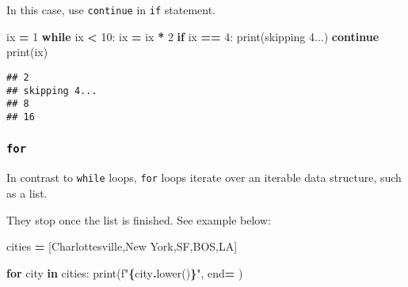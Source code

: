 \documentclass[
]{book}
\newenvironment{Shaded}{\begin{snugshade}}{\end{snugshade}}
\newcommand{\BuiltInTok}[1]{#1}
\newcommand{\ControlFlowTok}[1]{\textcolor[rgb]{0.13,0.29,0.53}{\textbf{#1}}}
\newcommand{\DecValTok}[1]{\textcolor[rgb]{0.00,0.00,0.81}{#1}}
\newcommand{\KeywordTok}[1]{\textcolor[rgb]{0.13,0.29,0.53}{\textbf{#1}}}
\newcommand{\NormalTok}[1]{#1}
\newcommand{\OperatorTok}[1]{\textcolor[rgb]{0.81,0.36,0.00}{\textbf{#1}}}
\newcommand{\SpecialCharTok}[1]{\textcolor[rgb]{0.81,0.36,0.00}{\textbf{#1}}}
\newcommand{\SpecialStringTok}[1]{\textcolor[rgb]{0.31,0.60,0.02}{#1}}
\newcommand{\StringTok}[1]{\textcolor[rgb]{0.31,0.60,0.02}{#1}}
\begin{document}
In this case, use \texttt{continue} in \texttt{if} statement.

\begin{Shaded}
\begin{Highlighting}[]
\NormalTok{ix }\OperatorTok{=} \DecValTok{1}
\ControlFlowTok{while}\NormalTok{ ix }\OperatorTok{\textless{}} \DecValTok{10}\NormalTok{:}
\NormalTok{    ix }\OperatorTok{=}\NormalTok{ ix }\OperatorTok{*} \DecValTok{2}
    \ControlFlowTok{if}\NormalTok{ ix }\OperatorTok{==} \DecValTok{4}\NormalTok{:}
        \BuiltInTok{print}\NormalTok{(}\StringTok{\textquotesingle{}skipping 4...\textquotesingle{}}\NormalTok{)}
        \ControlFlowTok{continue}
    \BuiltInTok{print}\NormalTok{(ix)}
\end{Highlighting}
\end{Shaded}

\begin{verbatim}
## 2
## skipping 4...
## 8
## 16
\end{verbatim}

\subsubsection{\texorpdfstring{\texttt{for}}{for}}\label{for}

In contrast to \texttt{while} loops, \texttt{for} loops iterate over an iterable data structure, such as a list.

They stop once the list is finished. See example below:

\begin{Shaded}
\begin{Highlighting}[]
\NormalTok{cities }\OperatorTok{=}\NormalTok{ [}\StringTok{\textquotesingle{}Charlottesville\textquotesingle{}}\NormalTok{,}\StringTok{\textquotesingle{}New York\textquotesingle{}}\NormalTok{,}\StringTok{\textquotesingle{}SF\textquotesingle{}}\NormalTok{,}\StringTok{\textquotesingle{}BOS\textquotesingle{}}\NormalTok{,}\StringTok{\textquotesingle{}LA\textquotesingle{}}\NormalTok{]}

\ControlFlowTok{for}\NormalTok{ city }\KeywordTok{in}\NormalTok{ cities:}
    \BuiltInTok{print}\NormalTok{(}\SpecialStringTok{f\textquotesingle{}"}\SpecialCharTok{\{}\NormalTok{city}\SpecialCharTok{.}\NormalTok{lower()}\SpecialCharTok{\}}\SpecialStringTok{"\textquotesingle{}}\NormalTok{, end}\OperatorTok{=}\StringTok{\textquotesingle{} \textquotesingle{}}\NormalTok{)}
\end{Highlighting}
\end{Shaded}
\end{document}

